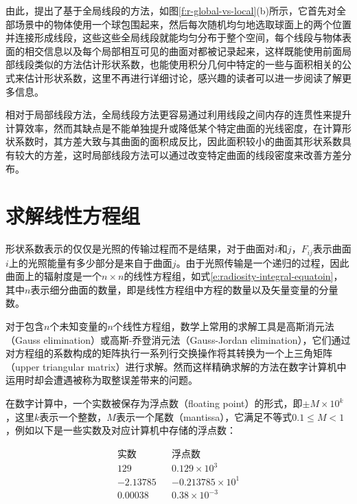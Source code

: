 由此，\cite{a:AnIntegralGeometryBasedMethodforFastForm-FactorComputation}提出了基于全局线段的方法，如图\ref{f:r-global-vs-local}(b)所示，它首先对全部场景中的物体使用一个球包围起来，然后每次随机均匀地选取球面上的两个位置并连接形成线段，这些这些全局线段就能均匀分布于整个空间，每个线段与物体表面的相交信息以及每个局部相互可见的曲面对都被记录起来，这样既能使用前面局部线段类似的方法估计形状系数，也能使用积分几何中特定的一些与面积相关的公式来估计形状系数，这里不再进行详细讨论，感兴趣的读者可以进一步阅读\cite{a:TheUseofGlobalRandomDirectionstoComputeRadiosityGlobalMonteCarloTechniques}了解更多信息。

相对于局部线段方法，全局线段方法更容易通过利用线段之间内存的连贯性来提升计算效率，然而其缺点是不能单独提升或降低某个特定曲面的光线密度，在计算形状系数时，其方差大致与其曲面的面积成反比，因此面积较小的曲面其形状系数具有较大的方差，这时局部线段方法可以通过改变特定曲面的线段密度来改善方差分布。





\section{求解线性方程组}\label{sec:r-solving-linear-equations}
形状系数表示的仅仅是光照的传输过程而不是结果，对于曲面对$i$和$j$，$F_{ij}$表示曲面$i$上的光照能量有多少部分是来自于曲面$j$。由于光照传输是一个递归的过程，因此曲面上的辐射度是一个$n\times n$的线性方程组，如式\ref{e:radiosity-integral-equatoin}，其中$n$表示细分曲面的数量，即是线性方程组中方程的数量以及矢量变量的分量数。

对于包含$n$个未知变量的$n$个线性方程组，数学上常用的求解工具是高斯消元法（Gauss elimination）或高斯-乔登消元法（Gauss-Jordan elimination），它们通过对方程组的系数构成的矩阵执行一系列行交换操作将其转换为一个上三角矩阵（upper triangular matrix）进行求解。然而这样精确求解的方法在数字计算机中运用时却会遭遇被称为取整误差带来的问题。

在数字计算中，一个实数被保存为浮点数（floating point）的形式，即$\pm M\times 10^{k}$，这里$k$表示一个整数，$M$表示一个尾数（mantissa），它满足不等式$0.1\leq M<1$，例如以下是一些实数及对应计算机中存储的浮点数：

\begin{equation}
\begin{aligned}
	\text{实数}   &&   \text{浮点数}	\\
	129          &&   0.129\times 10^{3}\\
	-2.13785 	 &&   -0.213785\times 10^{1}\\
	0.00038      &&   0.38\times 10^{-3}
\end{aligned}
\end{equation}

